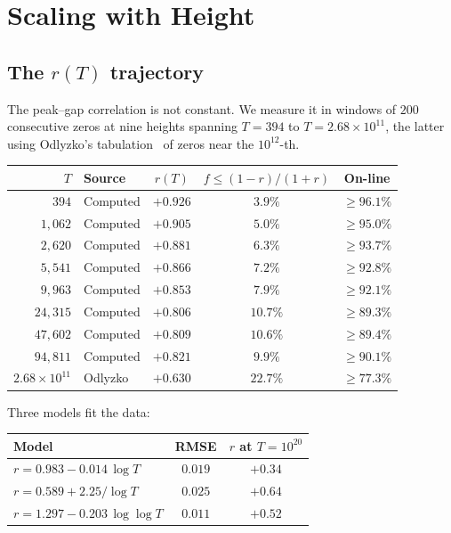 \documentclass[11pt,a4paper]{article}
\begin{document}
\section{Scaling with Height}\label{sec:scaling}

\subsection{The $r(T)$ trajectory}

The peak--gap correlation is not constant.
We measure it in windows of $200$ consecutive zeros at nine heights spanning $T = 394$ to $T = 2.68 \times 10^{11}$, the latter using Odlyzko's tabulation~\cite{Odlyzko1} of zeros near the $10^{12}$-th.

\begin{center}
\begin{tabular}{rlccc}
\toprule
$T$ & Source & $r(T)$ & $f \leq (1{-}r)/(1{+}r)$ & On-line \\
\midrule
$394$ & Computed & $+0.926$ & $3.9\%$ & $\geq 96.1\%$ \\
$1{,}062$ & Computed & $+0.905$ & $5.0\%$ & $\geq 95.0\%$ \\
$2{,}620$ & Computed & $+0.881$ & $6.3\%$ & $\geq 93.7\%$ \\
$5{,}541$ & Computed & $+0.866$ & $7.2\%$ & $\geq 92.8\%$ \\
$9{,}963$ & Computed & $+0.853$ & $7.9\%$ & $\geq 92.1\%$ \\
$24{,}315$ & Computed & $+0.806$ & $10.7\%$ & $\geq 89.3\%$ \\
$47{,}602$ & Computed & $+0.809$ & $10.6\%$ & $\geq 89.4\%$ \\
$94{,}811$ & Computed & $+0.821$ & $9.9\%$ & $\geq 90.1\%$ \\
$2.68 \times 10^{11}$ & Odlyzko & $+0.630$ & $22.7\%$ & $\geq 77.3\%$ \\
\bottomrule
\end{tabular}
\end{center}

Three models fit the data:

\begin{center}
\begin{tabular}{lcc}
\toprule
Model & RMSE & $r$ at $T = 10^{20}$ \\
\midrule
$r = 0.983 - 0.014\,\log T$ & $0.019$ & $+0.34$ \\
$r = 0.589 + 2.25 / \log T$ & $0.025$ & $+0.64$ \\
$r = 1.297 - 0.203\,\log\log T$ & $\mathbf{0.011}$ & $+0.52$ \\
\bottomrule
\end{tabular}
\end{center}
\end{document}
